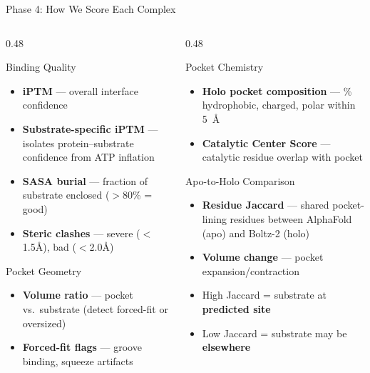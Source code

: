 \documentclass[aspectratio=169, 11pt]{beamer}
\begin{document}
\begin{frame}{Phase 4: How We Score Each Complex}
\vspace{-6pt}

\begin{columns}[T]
\begin{column}{0.48\textwidth}
\begin{block}{Binding Quality}
\begin{itemize}\scriptsize
\item \textbf{iPTM} --- overall interface confidence
\item \textbf{Substrate-specific iPTM} --- isolates protein--substrate confidence from ATP inflation
\item \textbf{SASA burial} --- fraction of substrate enclosed ($>$80\% = good)
\item \textbf{Steric clashes} --- severe ($<$1.5\AA), bad ($<$2.0\AA)
\end{itemize}
\end{block}

\begin{block}{Pocket Geometry}
\begin{itemize}\scriptsize
\item \textbf{Volume ratio} --- pocket vs.\ substrate (detect forced-fit or oversized)
\item \textbf{Forced-fit flags} --- groove binding, squeeze artifacts
\end{itemize}
\end{block}
\end{column}

\begin{column}{0.48\textwidth}
\begin{block}{Pocket Chemistry}
\begin{itemize}\scriptsize
\item \textbf{Holo pocket composition} --- \% hydrophobic, charged, polar within 5~\AA
\item \textbf{Catalytic Center Score} --- catalytic residue overlap with pocket
\end{itemize}
\end{block}

\begin{alertblock}{Apo-to-Holo Comparison}
\begin{itemize}\scriptsize
\item \textbf{Residue Jaccard} --- shared pocket-lining residues between AlphaFold (apo) and Boltz-2 (holo)
\item \textbf{Volume change} --- pocket expansion/contraction
\item High Jaccard = substrate at \textbf{predicted site}
\item Low Jaccard = substrate may be \textbf{elsewhere}
\end{itemize}
\end{alertblock}
\end{column}
\end{columns}


\end{frame}
\end{document}
